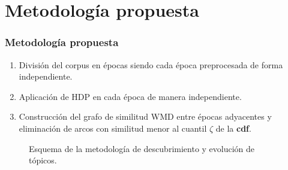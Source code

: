 \documentclass[
	spanish, %
	aspectratio=43, %
	hyperref={pdfencoding=auto,psdextra},
	xcolor={dvipsnames,table,usenames},
]{beamer}
\begin{document}
\section{Metodología propuesta}

\begin{frame}[t]
\frametitle{Metodología propuesta}
\begin{enumerate}
  \item División del corpus en épocas siendo cada época preprocesada de forma independiente. 
  \item Aplicación de HDP en cada época de manera independiente. 
  \item Construcción del grafo de similitud WMD entre épocas adyacentes y eliminación de arcos con similitud menor al cuantil $\zeta$ de la \textbf{cdf}.
\end{enumerate}

\vspace*{-0.1in}
\begin{figure}
\caption{Esquema de la metodología de descubrimiento y evolución de tópicos.}
\label{img:scheme}
\end{figure}

\end{frame}
\end{document}
